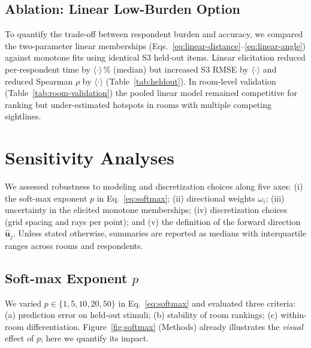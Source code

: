\documentclass[final,3p,times,review]{elsarticle}
\begin{document}
\subsection{Ablation: Linear Low-Burden Option}
To quantify the trade-off between respondent burden and accuracy, we compared the two-parameter linear memberships (Eqs.~\ref{eq:linear-distance}--\ref{eq:linear-angle}) against monotone fits using identical S3 held-out items. Linear elicitation reduced per-respondent time by $\langle \cdot \rangle$\,\% (median) but increased S3 RMSE by $\langle \cdot \rangle$ and reduced Spearman $\rho$ by $\langle \cdot \rangle$ (Table~\ref{tab:heldout}). In room-level validation (Table~\ref{tab:room-validation}) the pooled linear model remained competitive for ranking but under-estimated hotspots in rooms with multiple competing sightlines.

\section{Sensitivity Analyses}
\label{sec:sensitivity}
We assessed robustness to modeling and discretization choices along five axes: (i) the soft-max exponent $p$ in Eq.~\eqref{eq:softmax}; (ii) directional weights $\omega_i$; (iii) uncertainty in the elicited monotone memberships; (iv) discretization choices (grid spacing and rays per point); and (v) the definition of the forward direction $\hat{\mathbf{u}}_j$. Unless stated otherwise, summaries are reported as medians with interquartile ranges across rooms and respondents.

\subsection{Soft-max Exponent $p$}
We varied $p\in\{1,5,10,20,50\}$ in Eq.~\eqref{eq:softmax} and evaluated three criteria: (a) prediction error on held-out stimuli; (b) stability of room rankings; (c) within-room differentiation. Figure~\ref{fig:softmax} (Methods) already illustrates the \emph{visual} effect of $p$; here we quantify its impact.
\end{document}
